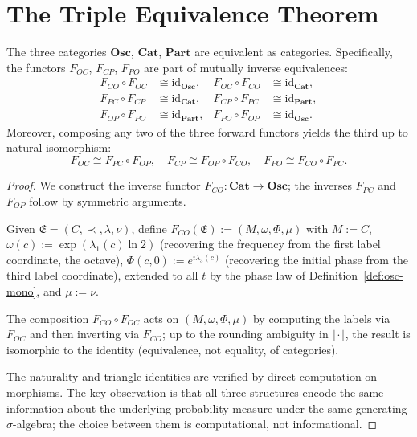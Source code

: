 \section{The Triple Equivalence Theorem}
\label{sec:ch15-equivalence}

\begin{theorem}\label{thm:triple-equiv-mono}
The three categories $\mathbf{Osc}$, $\mathbf{Cat}$, $\mathbf{Part}$ are
equivalent as categories.  Specifically, the functors $F_{OC}$, $F_{CP}$,
$F_{PO}$ are part of mutually inverse equivalences:
\begin{align}
  F_{CO} \circ F_{OC} &\cong \mathrm{id}_{\mathbf{Osc}}, &
  F_{OC} \circ F_{CO} &\cong \mathrm{id}_{\mathbf{Cat}}, \label{eq:OC-eq}\\
  F_{PC} \circ F_{CP} &\cong \mathrm{id}_{\mathbf{Cat}}, &
  F_{CP} \circ F_{PC} &\cong \mathrm{id}_{\mathbf{Part}}, \label{eq:CP-eq}\\
  F_{OP} \circ F_{PO} &\cong \mathrm{id}_{\mathbf{Part}}, &
  F_{PO} \circ F_{OP} &\cong \mathrm{id}_{\mathbf{Osc}}. \label{eq:PO-eq}
\end{align}
Moreover, composing any two of the three forward functors yields the third up
to natural isomorphism:
\[
  F_{OC} \cong F_{PC} \circ F_{OP}, \quad
  F_{CP} \cong F_{OP} \circ F_{CO}, \quad
  F_{PO} \cong F_{CO} \circ F_{PC}.
\]
\end{theorem}

\begin{proof}
We construct the inverse functor $F_{CO} : \mathbf{Cat} \to \mathbf{Osc}$;
the inverses $F_{PC}$ and $F_{OP}$ follow by symmetric arguments.

Given $\mathfrak{E} = (C, \prec, \lambda, \nu)$, define
$F_{CO}(\mathfrak{E}) := (M, \omega, \Phi, \mu)$ with $M := C$,
$\omega(c) := \exp(\lambda_1(c) \ln 2)$ (recovering the frequency from the
first label coordinate, the octave),
$\Phi(c, 0) := e^{i\lambda_3(c)}$ (recovering the initial phase from the
third label coordinate), extended to all $t$ by the phase law of
Definition~\ref{def:osc-mono}, and $\mu := \nu$.

The composition $F_{CO} \circ F_{OC}$ acts on $(M, \omega, \Phi, \mu)$ by
computing the labels via $F_{OC}$ and then inverting via $F_{CO}$; up to the
rounding ambiguity in $\lfloor\cdot\rfloor$, the result is isomorphic to the
identity (equivalence, not equality, of categories).

The naturality and triangle identities are verified by direct computation on
morphisms.  The key observation is that all three structures encode the same
information about the underlying probability measure under the same generating
$\sigma$-algebra; the choice between them is computational, not informational.
\end{proof}

